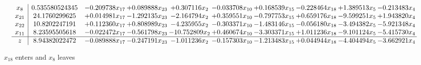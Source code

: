 \documentclass[10pt]{article}
\begin{document}
\[\begin{array}{c| c c@{\hskip 2pt} c@{\hskip 2pt} c@{\hskip 2pt} c@{\hskip 2pt} c@{\hskip 2pt} c@{\hskip 2pt} c@{\hskip 2pt} c@{\hskip 2pt} }
 x_{8}   &  0.535580524345 & -0.209738 x_{17} & + 0.089888 x_{23} & + 0.307116 x_{2} & -0.033708 x_{10} & + 0.168539 x_{15} & -0.228464 x_{18} & + 1.389513 x_{5} & -0.213483 x_{4}\\
 x_{21}   &  24.1760299625 & + 0.014981 x_{17} & -1.292135 x_{23} & -2.164794 x_{2} & + 0.359551 x_{10} & -0.797753 x_{15} & + 0.659176 x_{18} & -9.599251 x_{5} & + 1.943820 x_{4}\\
 x_{22}   &  10.8202247191 & + 0.112360 x_{17} & + 0.808989 x_{23} & -4.235955 x_{2} & -0.303371 x_{10} & -1.483146 x_{15} & -0.056180 x_{18} & -3.494382 x_{5} & -5.921348 x_{4}\\
 x_{11}   &  8.23595505618 & -0.022472 x_{17} & -0.561798 x_{23} & -10.752809 x_{2} & + 0.460674 x_{10} & -3.303371 x_{15} & + 1.011236 x_{18} & -9.101124 x_{5} & -5.415730 x_{4}\\
\hline
z    &  8.94382022472 & -0.089888 x_{17} & -0.247191 x_{23} & -1.011236 x_{2} & -0.157303 x_{10} & -1.213483 x_{15} & + 0.044944 x_{18} & -4.404494 x_{5} & -3.662921 x_{4}\\
\end{array}\]


 $ x_{18} $ enters and $ x_{8} $ leaves 
\end{document}
